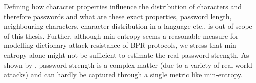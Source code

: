 
\begin{remark}
Defining how character properties influence the distribution \DD of characters and therefore passwords and what are these exact properties, \eg password length, neighbouring characters, character distribution in a language etc., is out of scope of this thesis.
Further, although min-entropy seems a reasonable measure for modelling dictionary attack resistance of \ac{BPR} protocols,
we stress that min-entropy alone might not be sufficient to estimate the real password strength. 
As shown by \citet{MazurekKVBCCKSU13}, password strength is a complex matter (due to a variety of real-world attacks) and can hardly be captured through a single metric like min-entropy.
\end{remark}

